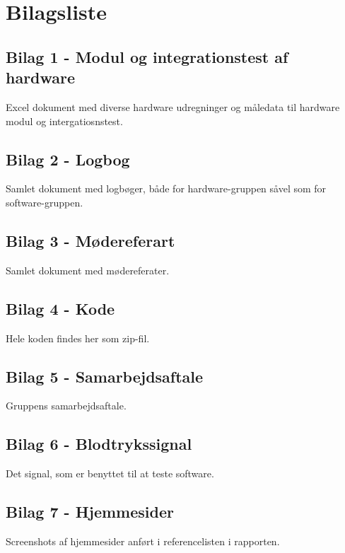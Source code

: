 \chapter{Bilagsliste}

\section{Bilag 1 - Modul og integrationstest af hardware}\label{Modul og integration}
Excel dokument med diverse hardware udregninger og måledata til hardware modul og intergatiosnstest.

\section{Bilag 2 - Logbog}\label{Logbog}
Samlet dokument med logbøger, både for hardware-gruppen såvel som for software-gruppen.

\section{Bilag 3 - Mødereferart}\label{Moedereferart}
Samlet dokument med mødereferater.

\section{Bilag 4 - Kode}\label{Kode}
Hele koden findes her som zip-fil.

\section{Bilag 5 - Samarbejdsaftale}\label{Samarbejdsaftale}
Gruppens samarbejdsaftale.

\section{Bilag 6 - Blodtrykssignal}\label{blodtrykssignal}
Det signal, som er benyttet til at teste software.

\section{Bilag 7 - Hjemmesider}\label{Hjemmesider}
Screenshots af hjemmesider anført i referencelisten i rapporten.

